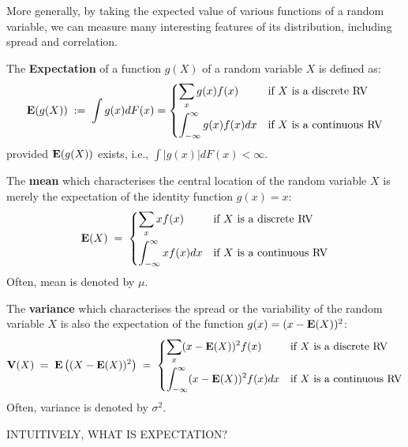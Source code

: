 More generally, by taking the expected value of various functions of a random variable, we can measure many interesting features of its distribution, including spread and correlation.

\begin{definition}\label{Df:expectation}
The \textbf{Expectation} of a function $g(X)$ of a random variable $X$ is defined as:
\[
\mathbf{E}(g(X))\; :=\; \int g(x) dF(x) = 
\begin{cases}
\displaystyle \sum_x g(x) f(x) & \text{if $X$ is a discrete RV}\\[12pt]
\displaystyle \int_{-\infty}^{\infty} g(x) f(x) dx & \text{if $X$ is a continuous RV}
\end{cases}
\]
provided $\mathbf{E}(g(X))$ exists, i.e., $\int |g(x)| dF(x) < \infty$.
\end{definition}

The {\bf mean} which characterises the central location of the random variable $X$ is merely the expectation of the identity function $g(x)=x$:
\[
\mathbf{E}(X)\; =\;
\begin{cases}
\displaystyle \sum_x x f(x) & \text{if $X$ is a discrete RV}\\[12pt]
\displaystyle\int_{-\infty}^{\infty} x f(x) dx & \text{if $X$ is a
  continuous RV}
\end{cases}
\]
Often, mean is denoted by $\mu$.

The \textbf{variance} which characterises the spread or the
  variability of the random variable $X$ is also the expectation of the
  function $g(x)=(x-\mathbf{E}(X))^2$:
\[
\mathbf{V}(X)\; =\; \mathbf{E} \left( (X-\mathbf{E}(X))^2 \right)\; =\;
\begin{cases}
\displaystyle\sum_x (x-\mathbf{E}(X))^2 f(x) & \text{if $X$ is a discrete RV}\\[12pt]
\displaystyle\int_{-\infty}^{\infty} (x-\mathbf{E}(X))^2 f(x) dx & \text{if $X$ is a continuous RV}
\end{cases}
\] 
Often, variance is denoted by $\sigma^2$. 

INTUITIVELY, WHAT IS EXPECTATION?\\

